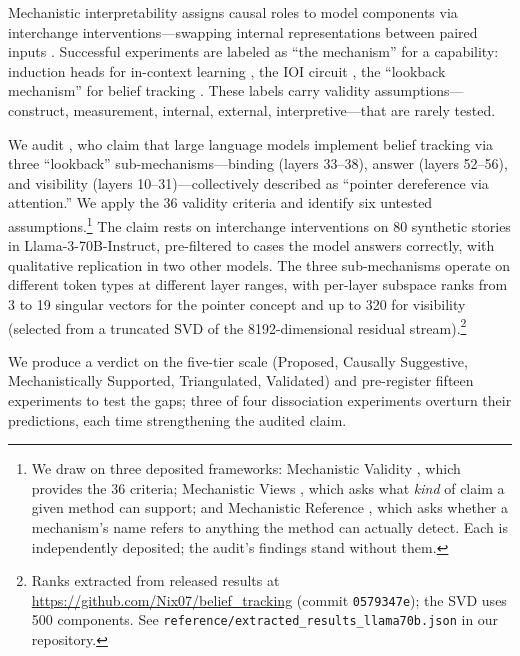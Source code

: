 \documentclass{article}
\begin{document}
Mechanistic interpretability assigns causal roles to model components via interchange interventions---swapping internal representations between paired inputs \citep{geiger2021causal, vig2020investigating}. Successful experiments are labeled as ``the mechanism'' for a capability: induction heads for in-context learning \citep{olsson2022context}, the IOI circuit \citep{wang2023interpretability}, the ``lookback mechanism'' for belief tracking \citep{prakash2025lookback}. These labels carry validity assumptions---construct, measurement, internal, external, interpretive---that are rarely tested.

We audit \citet{prakash2025lookback}, who claim that large language models implement belief tracking via three ``lookback'' sub-mechanisms---binding (layers 33--38), answer (layers 52--56), and visibility (layers 10--31)---collectively described as ``pointer dereference via attention.'' We apply the 36 validity criteria and identify six untested assumptions.\footnote{We draw on three deposited frameworks: Mechanistic Validity \citep{tower2026mechval}, which provides the 36 criteria; Mechanistic Views \citep{tower2026mechviews}, which asks what \emph{kind} of claim a given method can support; and Mechanistic Reference \citep{tower2026mechref}, which asks whether a mechanism's name refers to anything the method can actually detect. Each is independently deposited; the audit's findings stand without them.} The claim rests on interchange interventions on 80 synthetic stories in Llama-3-70B-Instruct, pre-filtered to cases the model answers correctly, with qualitative replication in two other models. The three sub-mechanisms operate on different token types at different layer ranges, with per-layer subspace ranks from 3 to 19 singular vectors for the pointer concept and up to 320 for visibility (selected from a truncated SVD of the 8192-dimensional residual stream).\footnote{Ranks extracted from released results at \url{https://github.com/Nix07/belief_tracking} (commit \texttt{0579347e}); the SVD uses 500 components. See \texttt{reference/extracted\_results\_llama70b.json} in our repository.}

We produce a verdict on the five-tier scale (Proposed, Causally Suggestive, Mechanistically Supported, Triangulated, Validated) and pre-register fifteen experiments to test the gaps; three of four dissociation experiments overturn their predictions, each time strengthening the audited claim.
\end{document}
